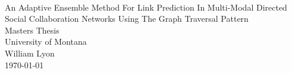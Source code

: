 




 


 \begin{titlepage}
 	\mbox{}\vspace{5\baselineskip}\\
 	\sffamily\huge
 	\centering
 	An Adaptive Ensemble Method For Link Prediction In Multi-Modal Directed Social Collaboration Networks Using The Graph Traversal Pattern
 	\vspace{3\baselineskip}\\
 	\rmfamily\Large
 	Masters Thesis \\ University of Montana
 	\vspace{2\baselineskip}\\
 	\rmfamily\Large
 	William Lyon
 	\vspace{1\baselineskip}\\
 	\today
 \end{titlepage}

% 
